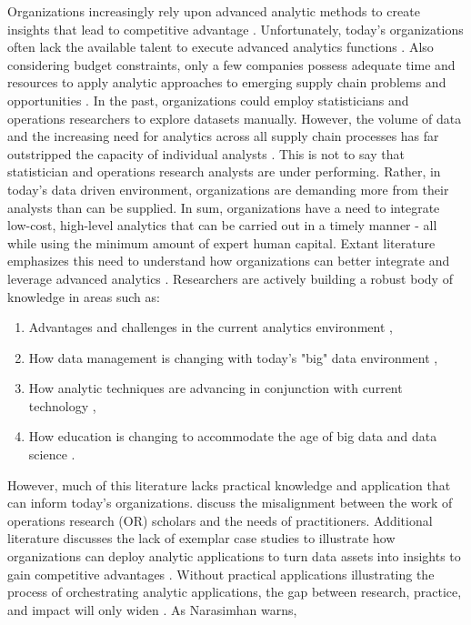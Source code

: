 \documentclass[twocolumn]{svjour3}       %
\begin{document}
Organizations increasingly rely upon advanced analytic methods to create insights that lead to competitive advantage \citep{wf13-2,ll13}. Unfortunately, today's organizations often lack the available talent to execute advanced analytics functions \citep{dp12}. Also considering budget constraints, only a few companies possess adequate time and resources to apply analytic approaches to emerging supply chain problems and opportunities \citep{bj16}. In the past, organizations could employ statisticians and operations researchers to explore datasets manually. However, the volume of data and the increasing need for analytics across all supply chain processes has far outstripped the capacity of individual analysts \citep{pf13}. This is not to say that statistician and operations research analysts are under performing.  Rather, in today's data driven environment, organizations are demanding more from their analysts than can be supplied.  In sum, organizations have a need to integrate low-cost, high-level analytics that can be carried out in a timely manner - all while using the minimum amount of expert human capital.
Extant literature emphasizes this need to understand how organizations can better integrate and leverage advanced analytics \citep{ss15}. Researchers are actively building a robust body of knowledge in areas such as:
\begin{enumerate}
  \item Advantages and challenges in the current analytics environment \citep{mb12,ots12,wgnp16},
  \item How data management is changing with today's "big" data environment \citep{cz14,wssa15,rmha16},
  \item How analytic techniques are advancing in conjunction with current technology \citep{hsbh16,wf13,wgnp16},
  \item How education is changing to accommodate the age of big data and data science \citep{ss15,dg15,gk14}.
\end{enumerate}
However, much of this literature lacks practical knowledge and application that can inform today's organizations. \citet{hsbh16} discuss the misalignment between the work of operations research (OR) scholars and the needs of practitioners. Additional literature discusses the lack of exemplar case studies to illustrate how organizations can deploy analytic applications to turn data assets into insights to gain competitive advantages \citep{gh14,p14,wgnp16}.  Without practical applications illustrating the process of orchestrating analytic applications, the gap between research, practice, and impact will only widen \citep{rmha16}.  As Narasimhan warns,
\end{document}
